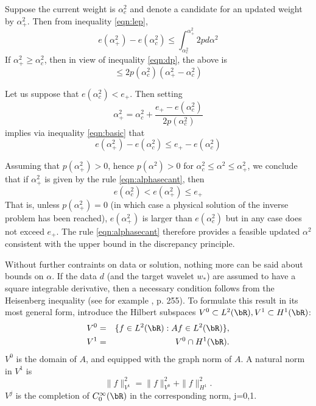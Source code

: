 Suppose the current weight is $\alpha^2_c$ and denote a candidate for an updated weight by $\alpha^2_+$. Then from inequality \ref{eqn:lep},
\begin{equation}
e(\alpha^2_+)-e(\alpha^2_c) \le \int_{\alpha^2_c}^{\alpha^2_+} 2p d\alpha^2
\end{equation}
If $\alpha^2_+ \ge \alpha^2_c$, then in view of inequality \ref{eqn:dp}, the above is
\begin{equation}
\label{eqn:basic}
\le 2 p(\alpha^2_c) (\alpha^2_+-\alpha^2_c)  
\end{equation}

Let us suppose that $e(\alpha^2_c) < e_{+}$. Then setting 
\begin{equation}
\label{eqn:alphasecant}
\alpha^2_+ = \alpha^2_c + \frac{e_{+}-e(\alpha^2_c)}{2p(\alpha^2_c)} 
\end{equation}
implies via inequality \ref{eqn:basic} that 
\begin{equation}
e(\alpha^2_+)-e(\alpha^2_c) \le e_{+}-e(\alpha^2_c)
\end{equation}

Assuming that $p(\alpha^2_+) > 0$, hence $p(\alpha^2)>0$ for $\alpha^2_c \le \alpha^2 \le \alpha^2_+$,  we conclude that if $\alpha^2_+$ is given by the rule \ref{eqn:alphasecant},
then
\begin{equation}
\label{eqn:assert}
e(\alpha^2_c) < e(\alpha^2_+) \le e_{+}
\end{equation}
That is, unless $p(\alpha^2_+) = 0$ (in which case a physical solution of the inverse problem has been reached),  $e(\alpha^2_+)$ is larger than $e(\alpha^2_c)$ but in any case does not exceed $e_+$. The rule \ref{eqn:alphasecant} therefore provides a feasible updated $\alpha^2$ consistent with the upper bound in the discrepancy principle.


Without further contraints on data or solution, nothing more can be
said about bounds on $\alpha$. If the data $d$ (and the target wavelet
$w_*$) are assumed to have a square integrable derivative, then a
necessary condition follows from the Heisenberg
inequality (see for example \cite{Folland:07}, p. 255). To formulate
this result in its most general form, introduce the Hilbert subspaces
$V^0 \subset L^2(\bR), V^1 \subset H^1(\bR)$:
\begin{eqnarray}
  V^0 & = & \{ f \in L^2(\bR): Af \in L^2(\bR)\}, \nonumber\\
  V^1 & = & V^0 \cap H^1(\bR).
            \label{eqn:vdef}
\end{eqnarray}
$V^0$ is the domain of $A$, and equipped with the graph norm of $A$. A
natural norm in $V^1$ is
\[
  \|f\|^2_{V^1} = \|f\|_{V^0}^2 + \|f\|_{H^1}^2.
\]
$V^j$ is the completion of $C_0^{\infty}(\bR)$ in the corresponding
norm, j=0,1.

